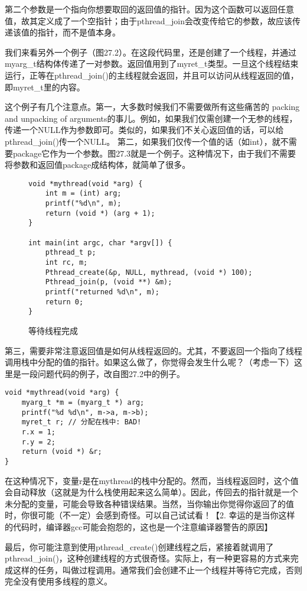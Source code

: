 第二个参数是一个指向你想要取回的返回值的指针。因为这个函数可以返回任意值，故其定义成了一个空指针；由于pthread\_join会改变传给它的参数，故应该传递该值的指针，而不是值本身。

我们来看另外一个例子（图27.2）。在这段代码里，还是创建了一个线程，并通过myarg\_t结构体传递了一对参数。返回值用到了myret\_t类型。一旦这个线程结束运行，正等在pthread\_join()的主线程就会返回，并且可以访问从线程返回的值，即myret\_t里的内容。



这个例子有几个注意点。第一，大多数时候我们不需要做所有这些痛苦的 packing and unpacking of arguments的事儿。例如，如果我们仅需创建一个无参的线程，传递一个NULL作为参数即可。类似的，如果我们不关心返回值的话，可以给pthread\_join()传一个NULL。
第二，如果我们仅传一个值的话（如int），就不需要package它作为一个参数。图27.3就是一个例子。这种情况下，由于我们不需要将参数和返回值package成结构体，就简单了很多。

\begin{figure}[h]
\begin{lstlisting}
void *mythread(void *arg) {
	int m = (int) arg;
	printf("%d\n", m);
	return (void *) (arg + 1);
}

int main(int argc, char *argv[]) {
	pthread_t p;
	int rc, m;
	Pthread_create(&p, NULL, mythread, (void *) 100);
	Pthread_join(p, (void **) &m);
	printf("returned %d\n", m);
	return 0;
}
\end{lstlisting}
\setlength{\abovecaptionskip}{2pt}
\caption{等待线程完成}
\end{figure}

第三，需要非常注意返回值是如何从线程返回的。尤其，不要返回一个指向了线程调用栈中分配的值的指针。如果这么做了，你觉得会发生什么呢？（考虑一下）这里是一段问题代码的例子，改自图27.2中的例子。

\begin{verbatim}
void *mythread(void *arg) {
    myarg_t *m = (myarg_t *) arg;
    printf("%d %d\n", m->a, m->b);
    myret_t r; // 分配在栈中: BAD!
    r.x = 1;
    r.y = 2;
    return (void *) &r;
}
\end{verbatim}

在这种情况下，变量r是在mythread的栈中分配的。然而，当线程返回时，这个值会自动释放（这就是为什么栈使用起来这么简单）。因此，传回去的指针就是一个未分配的变量，可能会导致各种错误结果。当然，当你输出你觉得你返回了的值时，你很可能（不一定）会感到奇怪。可以自己试试看！【2. 幸运的是当你这样的代码时，编译器gcc可能会抱怨的，这也是一个注意编译器警告的原因】

最后，你可能注意到使用pthread\_create()创建线程之后，紧接着就调用了pthread\_join()，这种创建线程的方式很奇怪。实际上，有一种更容易的方式来完成这样的任务，叫做过程调用。通常我们会创建不止一个线程并等待它完成，否则完全没有使用多线程的意义。

